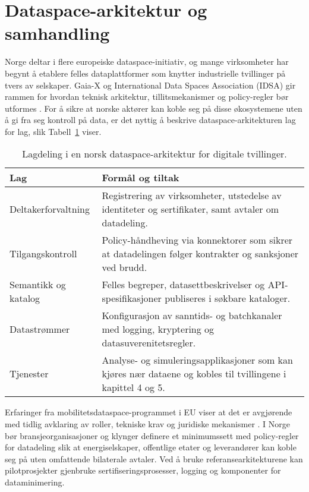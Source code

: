 \section{Dataspace-arkitektur og samhandling}
Norge deltar i flere europeiske dataspace-initiativ, og mange virksomheter har begynt å etablere felles dataplattformer som
knytter industrielle tvillinger på tvers av selskaper. Gaia-X og International Data Spaces Association (IDSA) gir rammen for
hvordan teknisk arkitektur, tillitsmekanismer og policy-regler bør utformes \citep{gaiax2023architecture,idsa2023ram}. For å
sikre at norske aktører kan koble seg på disse økosystemene uten å gi fra seg kontroll på data, er det nyttig å beskrive
dataspace-arkitekturen lag for lag, slik Tabell~\ref{tab:kap03-dataspace-lag} viser.

\begin{table}[ht]
    \centering
    \caption{Lagdeling i en norsk dataspace-arkitektur for digitale tvillinger.}
    \label{tab:kap03-dataspace-lag}
    \begin{tabular}{p{}p{}}
        \toprule
        \textbf{Lag} & \textbf{Formål og tiltak} \\
        \midrule
        Deltakerforvaltning & Registrering av virksomheter, utstedelse av identiteter og sertifikater, samt avtaler om datadeling. \\
        Tilgangskontroll & Policy-håndheving via konnektorer som sikrer at datadelingen følger kontrakter og sanksjoner ved brudd. \\
        Semantikk og katalog & Felles begreper, datasettbeskrivelser og API-spesifikasjoner publiseres i søkbare kataloger. \\
        Datastrømmer & Konfigurasjon av sanntids- og batchkanaler med logging, kryptering og datasuverenitetsregler. \\
        Tjenester & Analyse- og simuleringsapplikasjoner som kan kjøres nær dataene og kobles til tvillingene i kapittel 4 og 5. \\
        \bottomrule
    \end{tabular}
\end{table}

Erfaringer fra mobilitetsdataspace-programmet i EU viser at det er avgjørende med tidlig avklaring av roller, tekniske krav og
juridiske mekanismer \citep{ec2023mobilitydataspace}. I Norge bør bransjeorganisasjoner og klynger definere et minimumssett med
policy-regler for datadeling slik at energiselskaper, offentlige etater og leverandører kan koble seg på uten omfattende
bilaterale avtaler. Ved å bruke referansearkitekturene kan pilotprosjekter gjenbruke sertifiseringsprosesser, logging og
komponenter for dataminimering.

